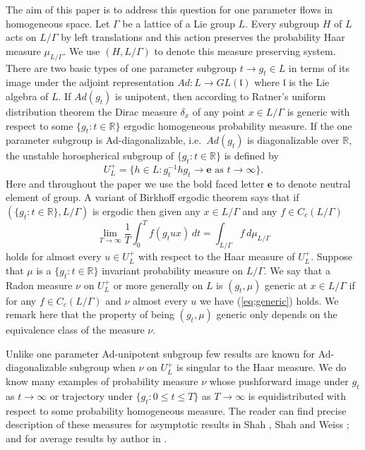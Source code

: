 \documentclass[12pt]{amsart}
\theoremstyle{definition}
\theoremstyle{remark}
\numberwithin{equation}{section}
\begin{document}
The aim of this paper is to address this question for one parameter  flows in homogeneous space. 
Let $\Gamma$ be a  lattice
of a   Lie group  $L$.
Every subgroup $H$ of $L$
 acts on $L/\Gamma$ by left translations and this action preserves the probability Haar measure $\mu_{L/\Gamma}$. 
 We use $(H, L/\Gamma)$ to denote this measure preserving system. 
 There are two basic types of one parameter subgroup $t\to g_t\in L$ in terms of its image under the adjoint 
representation $Ad: L\to GL(\mathfrak l)$ where $\mathfrak l$ is the Lie algebra of $L$.
If  $Ad(g_t)$  is unipotent, then according to  Ratner's uniform distribution theorem \cite{r912}  
    the Dirac measure $\delta_x$ of any point $x\in L/\Gamma$ is generic 
with respect to some $\{g_t:t\in \mathbb R\}$ ergodic homogeneous probability measure.
If  the 
one parameter subgroup is
 Ad-diagonalizable, i.e.~$Ad(g_t)$
 is diagonalizable over $\mathbb R$, the unstable horospherical subgroup
 of $\{g_t: t\in \mathbb R\}$  is defined by 
\[
U^+_L=\{h\in  L: g_t^{-1}hg_t\to \mathbf e \mbox{ as } t\to \infty\}.
\]
Here and 
throughout the paper we use   the bold faced letter 
  $\mathbf e$ to denote  neutral element of group.
A   variant of Birkhoff ergodic theorem says that 
if  
   $(\{g_t :t\in \mathbb R\}, L/\Gamma)$ is ergodic then  
 given any $x\in L/\Gamma$ and any    $f\in C_c(L/\Gamma)$
\begin{equation}\label{eq;generic}
\lim_{T\to \infty}\frac{1}{T}\int_0^T f(g_tux)\, dt=\int_{L/\Gamma} f \, d\mu_{L/\Gamma}
\end{equation}
holds for almost every  $u\in U_L^+$ with respect to the Haar measure of $U_L^+$.
Suppose that $\mu$  is a  $\{g_t: t\in\mathbb R\}$ invariant  probability measure  on $L/\Gamma$.
We say that a   Radon measure  $\nu$ on $U^+_L$  or 
more generally on $L$  is  $(g_t, \mu)$ generic  at $x\in L/\Gamma$
if for any  $f\in C_c(L/
\Gamma)$ and   $\nu$ almost every $u $ we have  (\ref{eq;generic}) holds.
We remark here that the property of being $(g_t, \mu)$ generic only depends on the equivalence class 
of the measure  $\nu$. 

Unlike one parameter Ad-unipotent subgroup few results are known for Ad-diagonalizable subgroup when
 $\nu$ on $U_L^+$  is singular to the Haar measure. 
 We do know many examples of  probability measure $\nu$ whose pushforward  image 
 under $g_t$ as $t\to \infty$ or  trajectory under $\{g_t:0\le t\le T\}$ as $T\to\infty$
  is 
 equidistributed with respect to some probability homogeneous measure.
The   reader can find precise description of these  measures  for asymptotic results in Shah \cite{s96}\cite{s09}\cite{s092}\cite{s093}\cite{s10}, 
Shah and Weiss \cite{sw96}; and for average results by author in  
\cite{shi12}\cite{shi122}.
 
\end{document}

